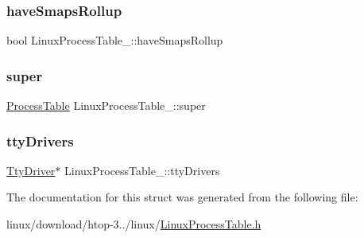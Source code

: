 \subsubsection{\texorpdfstring{have\+Smaps\+Rollup}{haveSmapsRollup}}
{\footnotesize\ttfamily bool Linux\+Process\+Table\+\_\+\+::have\+Smaps\+Rollup}

\mbox{\label{structLinuxProcessTable___a634b475fdbddf4fa961b42a225a0d21b}} 
\subsubsection{\texorpdfstring{super}{super}}
{\footnotesize\ttfamily \hyperlink{ProcessTable_8h_a54ec62da6f9d80d4d06e3845a2597a80}{Process\+Table} Linux\+Process\+Table\+\_\+\+::super}

\mbox{\label{structLinuxProcessTable___a4703b7851332405c580e36782b817031}} 
\subsubsection{\texorpdfstring{tty\+Drivers}{ttyDrivers}}
{\footnotesize\ttfamily \hyperlink{LinuxProcessTable_8h_ae3b628cb53d0ffcc7fa8f057f5852817}{Tty\+Driver}$\ast$ Linux\+Process\+Table\+\_\+\+::tty\+Drivers}



The documentation for this struct was generated from the following file\+:\begin{DoxyCompactItemize}
\item 
linux/download/htop-\/3../linux/\hyperlink{LinuxProcessTable_8h}{Linux\+Process\+Table.\+h}\end{DoxyCompactItemize}
